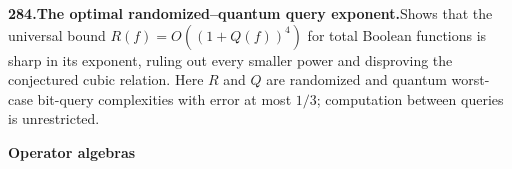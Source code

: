 \documentclass[11pt,a4paper]{article}
\begin{document}
  \par \begin{minipage}{\linewidth}
  \fontsize{10.5}{12.6}\selectfont\RaggedRight
  \hypertarget{result 284}{}
  {\bfseries\textcolor{muted}{284.}\enspace The optimal randomized--quantum query exponent.}\enspace Shows that the universal bound $R(f)=O((1+Q(f))^4)$ for total Boolean functions is sharp in its exponent, ruling out every smaller power and disproving the conjectured cubic relation. Here $R$ and $Q$ are randomized and quantum worst-case bit-query complexities with error at most $1/3$; computation between queries is unrestricted.\par
  \end{minipage}\par\vspace{5pt}



  \par{}\addvspace{12pt}
  \hypertarget{subject 16}{}\label{subject 16}
  {\fontsize{15}{18}\selectfont\bfseries Operator algebras\par}
  \nobreak\vspace{9pt}\nobreak
\end{document}
